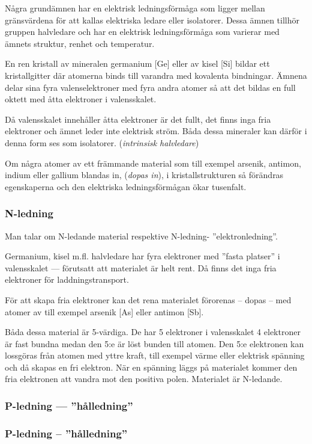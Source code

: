 Några grundämnen har en elektrisk ledningsförmåga som ligger mellan gränsvärdena
för att kallas elektriska ledare eller isolatorer.
Dessa ämnen tillhör gruppen halvledare och har en elektrisk ledningsförmåga som
varierar med ämnets struktur, renhet och temperatur.

En ren kristall av mineralen germanium [Ge] eller av kisel [Si] bildar ett
kristallgitter där atomerna binds till varandra med kovalenta bindningar.
Ämnena delar sina fyra valenselektroner med fyra andra atomer så att det
bildas en full oktett med åtta elektroner i valensskalet.

Då valensskalet innehåller åtta elektroner är det fullt, det finns inga fria
elektroner och ämnet leder inte elektrisk ström.
Båda dessa mineraler kan därför i denna form ses som isolatorer.
(\emph{intrinsisk halvledare})

Om några atomer av ett främmande material som till exempel arsenik, antimon,
indium eller gallium blandas in, (\emph{dopas in}), i kristallstrukturen så
förändras egenskaperna och den elektriska ledningsförmågan ökar tusenfalt.

\subsubsection{N-ledning}

Man talar om N-ledande material respektive N-ledning- ''elektronledning''.

Germanium, kisel m.fl. halvledare har fyra elektroner med ''fasta platser'' i
valensskalet --- förutsatt att materialet är helt rent.
Då finns det inga fria elektroner för laddningstransport.

För att skapa fria elektroner kan det rena materialet förorenas -- dopas -- med
atomer av till exempel arsenik [As] eller antimon [Sb].

Båda dessa material är 5-värdiga.
De har 5 elektroner i valensskalet 4 elektroner är fast bundna medan
den 5:e är löst bunden till atomen.
Den 5:e elektronen kan lossgöras från atomen med yttre kraft, till exempel värme eller
elektrisk spänning och då skapas en fri elektron.
När en spänning läggs på materialet kommer den fria elektronen att vandra mot
den positiva polen.
Materialet är N-ledande.

\subsubsection{P-ledning --- ''hålledning''}
\subsubsection{P-ledning -- ''hålledning''}

